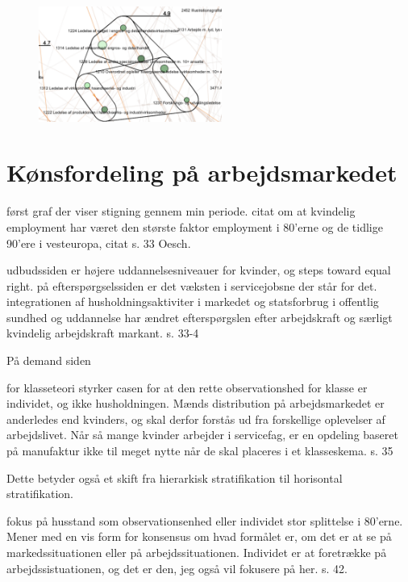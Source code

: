 %
\begin{figure}
  \vspace{-20pt}
  \begin{center}
    \includegraphics[width=6cm]{fig/segzoom/seg_4_9.pdf}
   \caption{}
   \label{fig_delanalyse1_zoom_4_9}
  \end{center}
  \vspace{-20pt}
\end{figure}
%




\section{Kønsfordeling på arbejdsmarkedet \label{sec_}}

først graf der viser stigning gennem min periode. citat om at kvindelig employment har været den største faktor employment i 80'erne og de tidlige 90'ere i vesteuropa, citat s. 33 Oesch.

udbudssiden er højere uddannelsesniveauer for kvinder, og steps toward equal right. på efterspørgselssiden er det væksten i servicejobsne der står for det. integrationen af husholdningsaktiviter i markedet og statsforbrug i offentlig sundhed og uddannelse har ændret efterspørgslen efter arbejdskraft og særligt kvindelig arbejdskraft markant. s. 33-4 

På demand siden


for klasseteori styrker casen for at den rette observationshed for klasse er individet, og ikke husholdningen. Mænds distribution på arbejdsmarkedet er anderledes end kvinders, og skal derfor forstås ud fra forskellige oplevelser af arbejdslivet. Når så mange kvinder arbejder i servicefag, er en opdeling baseret på manufaktur ikke til meget nytte når de skal placeres i et klasseskema. s. 35

Dette betyder også et skift fra hierarkisk stratifikation til horisontal stratifikation. 

fokus på husstand som observationsenhed eller individet stor splittelse i 80'erne. Mener med en vis form for konsensus om hvad formålet er, om det er at se på markedssituationen eller på arbejdssituationen. Individet er at foretrække på arbejdssistuationen, og det er den, jeg også vil fokusere på her. s. 42. 

